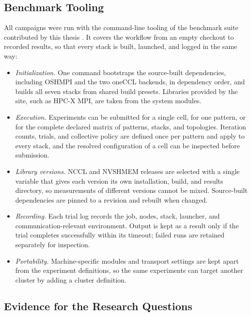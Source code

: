 \subsection{Benchmark Tooling}\label{sec:harness}

All campaigns were run with the command-line tooling of the benchmark suite contributed by this thesis \cite{merenda_gpu_comm_benchmark_2026}. It covers the workflow from an empty checkout to recorded results, so that every stack is built, launched, and logged in the same way:

\begin{itemize}
    \item \emph{Initialization.} One command bootstraps the source-built dependencies, including OSHMPI and the two oneCCL backends, in dependency order, and builds all seven stacks from shared build presets. Libraries provided by the site, such as HPC-X MPI, are taken from the system modules.
    \item \emph{Execution.} Experiments can be submitted for a single cell, for one pattern, or for the complete declared matrix of patterns, stacks, and topologies. Iteration counts, trials, and collective policy are defined once per pattern and apply to every stack, and the resolved configuration of a cell can be inspected before submission.
    \item \emph{Library versions.} NCCL and NVSHMEM releases are selected with a single variable that gives each version its own installation, build, and results directory, so measurements of different versions cannot be mixed. Source-built dependencies are pinned to a revision and rebuilt when changed.
    \item \emph{Recording.} Each trial log records the job, nodes, stack, launcher, and communication-relevant environment. Output is kept as a result only if the trial completes successfully within its timeout; failed runs are retained separately for inspection.
    \item \emph{Portability.} Machine-specific modules and transport settings are kept apart from the experiment definitions, so the same experiments can target another cluster by adding a cluster definition.
\end{itemize}

\subsection{Evidence for the Research Questions}\label{sec:research-evidence}

